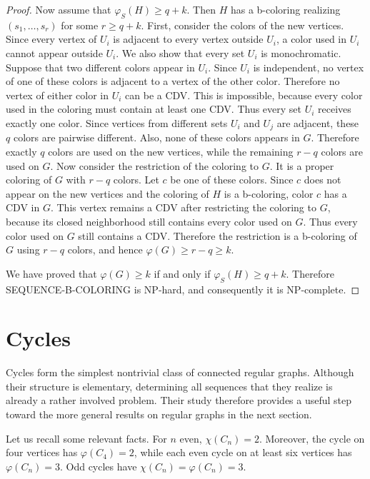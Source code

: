\documentclass{article}
\theoremstyle{definition}
\begin{document}
\begin{proof}
Now assume that $\varphi_S(H)\geq q+k$. Then $H$ has a b-coloring realizing $(s_1,\ldots,s_r)$ for some $r\geq q+k$. First, consider the colors of the new vertices. Since every vertex of $U_i$ is adjacent to every vertex outside $U_i$, a color used in $U_i$ cannot appear outside $U_i$. We also show that every set $U_i$ is monochromatic. Suppose that two different colors appear in $U_i$. Since $U_i$ is independent, no vertex of one of these colors is adjacent to a vertex of the other color. Therefore no vertex of either color in $U_i$ can be a CDV. This is impossible, because every color used in the coloring must contain at least one CDV. Thus every set $U_i$ receives exactly one color. Since vertices from different sets $U_i$ and $U_j$ are adjacent, these $q$ colors are pairwise different. Also, none of these colors appears in $G$. Therefore exactly $q$ colors are used on the new vertices, while the remaining $r-q$ colors are used on $G$. Now consider the restriction of the coloring to $G$. It is a proper coloring of $G$ with $r-q$ colors. Let $c$ be one of these colors. Since $c$ does not appear on the new vertices and the coloring of $H$ is a b-coloring, color $c$ has a CDV in $G$. This vertex remains a CDV after restricting the coloring to $G$, because its closed neighborhood still contains every color used on $G$. Thus every color used on $G$ still contains a CDV. Therefore the restriction is a b-coloring of $G$ using $r-q$ colors, and hence $\varphi(G)\geq r-q\geq k$.

We have proved that $\varphi(G)\geq k$ if and only if $\varphi_S(H)\geq q+k$. Therefore SEQUENCE-B-COLORING is NP-hard, and consequently it is NP-complete.
\end{proof}

\section{Cycles}\label{s:cycles}

Cycles form the simplest nontrivial class of connected regular graphs. Although their structure is elementary, determining all sequences that they realize is already a rather involved problem. Their study therefore provides a useful step toward the more general results on regular graphs in the next section.

Let us recall some relevant facts.
For $n$ even, $\chi(C_n)=2$.
Moreover, the cycle on four vertices has $\varphi(C_4)=2$, while each even cycle on at least six vertices has $\varphi(C_n)=3$.
Odd cycles have $\chi(C_n)=\varphi(C_n)=3$.
\end{document}
